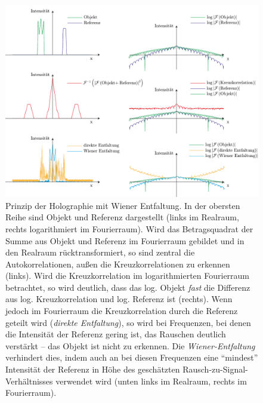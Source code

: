 \begin{figure}
	\centering
	\includegraphics[width=.9\textwidth]{images/wiener.pdf}
	\caption[Prinzip Enfaltung]{Prinzip der Holographie mit  Wiener Entfaltung. In der obersten Reihe sind Objekt und Referenz dargestellt (links im Realraum, rechts logarithmiert im Fourierraum). Wird das Betragsquadrat der Summe aus Objekt und Referenz im Fourierraum gebildet und in den Realraum rücktransformiert, so sind zentral die Autokorrelationen, außen die Kreuzkorrelationen zu erkennen (links). Wird die Kreuzkorrelation im logarithmierten Fourierraum betrachtet, so wird deutlich, dass das log. Objekt \textit{fast} die Differenz aus log. Kreuzkorrelation und log. Referenz ist (rechts). Wenn jedoch im Fourierraum die Kreuzkorrelation durch die Referenz geteilt wird (\textit{direkte Entfaltung}), so wird bei Frequenzen, bei denen die Intensität der Referenz gering ist, das Rauschen deutlich verstärkt -- das Objekt ist nicht zu erkennen. Die \textit{Wiener-Entfaltung} verhindert dies, indem auch an bei diesen Frequenzen eine "`mindest"' Intensität der Referenz in Höhe des geschätzten Rausch-zu-Signal-Verhältnisses verwendet wird (unten links im Realraum, rechts im Fourierraum). }
	\label{fig:wiener}
\end{figure} 

